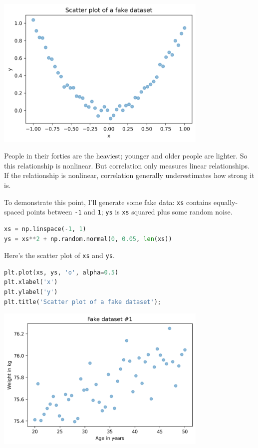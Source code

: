 \begin{lstlisting}[language=Python,style=source]
\end{lstlisting}

\begin{center}
\includegraphics[width=4in]{chapters/09_relationships_files/09_relationships_62_0.png}
\end{center}

People in their forties are the heaviest; younger and older people are
lighter. So this relationship is nonlinear. But correlation only
measures linear relationships. If the relationship is nonlinear,
correlation generally underestimates how strong it is.

To demonstrate this point, I'll generate some fake data:
\passthrough{\lstinline!xs!} contains equally-spaced points between
\passthrough{\lstinline!-1!} and \passthrough{\lstinline!1!};
\passthrough{\lstinline!ys!} is \passthrough{\lstinline!xs!} squared
plus some random noise.

\begin{lstlisting}[language=Python,style=source]
xs = np.linspace(-1, 1)
ys = xs**2 + np.random.normal(0, 0.05, len(xs))
\end{lstlisting}

Here's the scatter plot of \passthrough{\lstinline!xs!} and
\passthrough{\lstinline!ys!}.

\begin{lstlisting}[language=Python,style=source]
plt.plot(xs, ys, 'o', alpha=0.5)
plt.xlabel('x')
plt.ylabel('y')
plt.title('Scatter plot of a fake dataset');
\end{lstlisting}

\begin{center}
\includegraphics[width=4in]{chapters/09_relationships_files/09_relationships_66_0.png}
\end{center}

